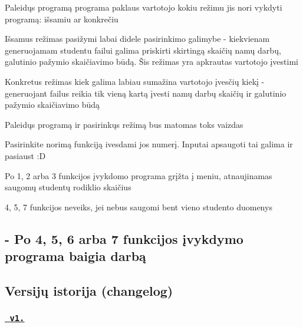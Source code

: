 \begin{DoxyItemize}
\item Paleidųs programą programa paklaus vartotojo kokiu režimu jis nori vykdyti programą\+: išsamiu ar konkrečiu
\item Išsamus režimas pasižymi labai didele pasirinkimo galimybe -\/ kiekvienam generuojamam studentu failui galima priskirti skirtingą skaičių namų darbų, galutinio pažymio skaičiavimo būdą. Šis režimas yra apkrautas vartotojo įvestimi
\item Konkretus režimas kiek galima labiau sumažina vartotojo įvesčių kiekį -\/ generuojant failus reikia tik vieną kartą įvesti namų darbų skaičių ir galutinio pažymio skaičiavimo būdą
\item Paleidųs programą ir pasirinkųs režimą bus matomas toks vaizdas 
\begin{DoxyCode}{0}
\end{DoxyCode}

\item Pasirinkite norimą funkciją ivesdami jos numerį. Input\textquotesingle{}ai apsaugoti tai galima ir pasiaust \+:D
\item Po 1, 2 arba 3 funkcijos įvykdomo programa grįžta į meniu, atnaujinamas saugomų studentų rodiklio skaičius
\item 4, 5, 7 funkcijos neveiks, jei nebus saugomi bent vieno studento duomenys \subsection*{-\/ Po 4, 5, 6 arba 7 funkcijos įvykdymo programa baigia darbą }
\end{DoxyItemize}

\subsection*{Versijų istorija (changelog)}



 \subsubsection*{\href{https://github.com/gitguuddd/Obj_Duomenu_Apdorojimas_class/releases/tag/v1.5}{\texttt{ v1.}}}

